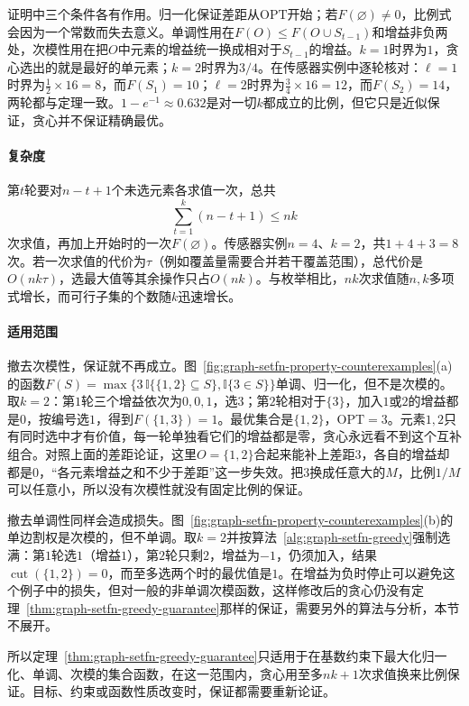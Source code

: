 证明中三个条件各有作用。归一化保证差距从$\mathrm{OPT}$开始；若$F(\varnothing)\neq0$，比例式会因为一个常数而失去意义。单调性用在$F(O)\leq F(O\cup S_{t-1})$和增益非负两处，次模性用在把$O$中元素的增益统一换成相对于$S_{t-1}$的增益。$k=1$时界为$1$，贪心选出的就是最好的单元素；$k=2$时界为$3/4$。在传感器实例中逐轮核对：$\ell=1$时界为$\frac12\times16=8$，而$F(S_1)=10$；$\ell=2$时界为$\frac34\times16=12$，而$F(S_2)=14$，两轮都与定理一致。$1-e^{-1}\approx0.632$是对一切$k$都成立的比例，但它只是近似保证，贪心并不保证精确最优。

\paragraph{复杂度}
第$t$轮要对$n-t+1$个未选元素各求值一次，总共
\[
  \sum_{t=1}^{k}(n-t+1)\leq nk
\]
次求值，再加上开始时的一次$F(\varnothing)$。传感器实例$n=4$、$k=2$，共$1+4+3=8$次。若一次求值的代价为$\tau$（例如覆盖量需要合并若干覆盖范围），总代价是$O(nk\tau)$，选最大值等其余操作只占$O(nk)$。与枚举相比，$nk$次求值随$n,k$多项式增长，而可行子集的个数随$k$迅速增长。

\paragraph{适用范围}
撤去次模性，保证就不再成立。图~\ref{fig:graph-setfn-property-counterexamples}(a)的函数$F(S)=\max\{3\,\mathbb I\{\{1,2\}\subseteq S\},\mathbb I\{3\in S\}\}$单调、归一化，但不是次模的。取$k=2$：第$1$轮三个增益依次为$0,0,1$，选$3$；第$2$轮相对于$\{3\}$，加入$1$或$2$的增益都是$0$，按编号选$1$，得到$F(\{1,3\})=1$。最优集合是$\{1,2\}$，$\mathrm{OPT}=3$。元素$1,2$只有同时选中才有价值，每一轮单独看它们的增益都是零，贪心永远看不到这个互补组合。对照上面的差距论证，这里$O=\{1,2\}$合起来能补上差距$3$，各自的增益却都是$0$，“各元素增益之和不少于差距”这一步失效。把$3$换成任意大的$M$，比例$1/M$可以任意小，所以没有次模性就没有固定比例的保证。

撤去单调性同样会造成损失。图~\ref{fig:graph-setfn-property-counterexamples}(b)的单边割权是次模的，但不单调。取$k=2$并按算法~\ref{alg:graph-setfn-greedy}强制选满：第$1$轮选$1$（增益$1$），第$2$轮只剩$2$，增益为$-1$，仍须加入，结果$\operatorname{cut}(\{1,2\})=0$，而至多选两个时的最优值是$1$。在增益为负时停止可以避免这个例子中的损失，但对一般的非单调次模函数，这样修改后的贪心仍没有定理~\ref{thm:graph-setfn-greedy-guarantee}那样的保证，需要另外的算法与分析，本节不展开。

所以定理~\ref{thm:graph-setfn-greedy-guarantee}只适用于在基数约束下最大化归一化、单调、次模的集合函数，在这一范围内，贪心用至多$nk+1$次求值换来比例保证。目标、约束或函数性质改变时，保证都需要重新论证。

